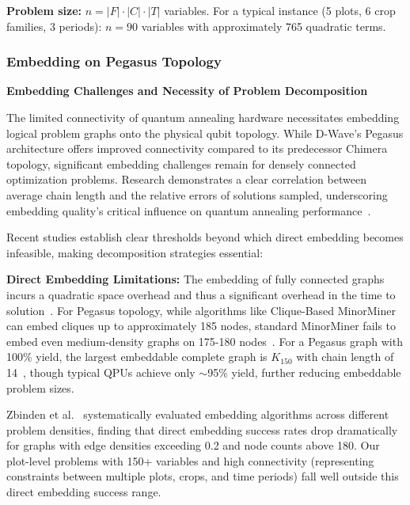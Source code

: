 \documentclass{oqireport}
\begin{document}
\textbf{Problem size:} $n = |F| \cdot |C| \cdot |T|$ variables. For a typical instance (5 plots, 6 crop families, 3 periods): $n = 90$ variables with approximately 765 quadratic terms.




\subsubsection{Embedding on Pegasus Topology}

\textbf{Embedding Challenges and Necessity of Problem Decomposition}

The limited connectivity of quantum annealing hardware necessitates embedding logical problem graphs onto the physical qubit topology. While D-Wave's Pegasus architecture offers improved connectivity compared to its predecessor Chimera topology, significant embedding challenges remain for densely connected optimization problems. Research demonstrates a clear correlation between average chain length and the relative errors of solutions sampled, underscoring embedding quality's critical influence on quantum annealing performance~\cite{prxquantum2040322}.

Recent studies establish clear thresholds beyond which direct embedding becomes infeasible, making decomposition strategies essential:

\textbf{Direct Embedding Limitations:}
The embedding of fully connected graphs incurs a quadratic space overhead and thus a significant overhead in the time to solution~\cite{prxquantum2040322,qute202300104}. For Pegasus topology, while algorithms like Clique-Based MinorMiner can embed cliques up to approximately 185 nodes, standard MinorMiner fails to embed even medium-density graphs on 175-180 nodes~\cite{zbinden2020embedding,qute202300104}. For a Pegasus graph with 100\% yield, the largest embeddable complete graph is $K_{150}$ with chain length of 14~\cite{boothby2020next}, though typical QPUs achieve only $\sim$95\% yield, further reducing embeddable problem sizes.

Zbinden et al.~\cite{zbinden2020embedding} systematically evaluated embedding algorithms across different problem densities, finding that direct embedding success rates drop dramatically for graphs with edge densities exceeding 0.2 and node counts above 180. Our plot-level problems with 150+ variables and high connectivity (representing constraints between multiple plots, crops, and time periods) fall well outside this direct embedding success range.
\end{document}
